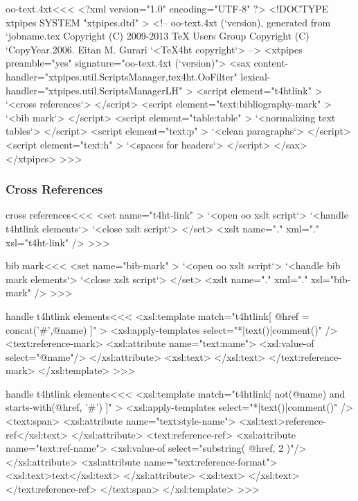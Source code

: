 \documentclass{article}
\begin{document}






\<oo-text.4xt\><<<
<?xml version="1.0" encoding="UTF-8" ?>
<!DOCTYPE xtpipes SYSTEM "xtpipes.dtd" >
<!-- oo-text.4xt (`version), generated from `jobname.tex
     Copyright (C) 2009-2013 TeX Users Group
     Copyright (C) `CopyYear.2006. Eitan M. Gurari
`<TeX4ht copyright`> -->
<xtpipes preamble="yes" signature="oo-text.4xt (`version)">
   <sax content-handler="xtpipes.util.ScriptsManager,tex4ht.OoFilter" 
        lexical-handler="xtpipes.util.ScriptsManagerLH" >
      <script element="t4htlink" >
         `<cross references`>
      </script> 
      <script element="text:bibliography-mark" >
         `<bib mark`>
      </script> 
      <script element="table:table" >
         `<normalizing text tables`>
      </script> 
      <script element="text:p" >
         `<clean paragraphs`>
      </script> 
      <script element="text:h" >
         `<spaces for headers`>
      </script> 
   </sax>
</xtpipes>
>>>


\subsubsection{Cross References}



\<cross references\><<<
<set name="t4ht-link" >
   `<open oo xslt script`>
    `<handle t4htlink elements`>
   `<close xslt script`>
</set>
<xslt name="." xml="." xsl="t4ht-link" />
>>>

\<bib mark\><<<
<set name="bib-mark" >
   `<open oo xslt script`>
    `<handle bib mark elements`>
   `<close xslt script`>
</set>
<xslt name="." xml="." xsl="bib-mark" />
>>>



\<handle t4htlink elements\><<<
<xsl:template match="t4htlink[ @href = concat('#',@name) ]" >
  <xsl:apply-templates select="*|text()|comment()" />
  <text:reference-mark>
     <xsl:attribute name="text:name">
        <xsl:value-of select="@name"/>
     </xsl:attribute>
     <xsl:text> </xsl:text>
  </text:reference-mark>
</xsl:template> 
>>>

\<handle t4htlink elements\><<<
<xsl:template match="t4htlink[ not(@name) 
                           and
                               starts-with(@href, '#') 
]" >
  <xsl:apply-templates select="*|text()|comment()" />
   <text:span>
        <xsl:attribute name="text:style-name">
           <xsl:text>reference-ref</xsl:text>
        </xsl:attribute>
     <text:reference-ref>
        <xsl:attribute name="text:ref-name">
           <xsl:value-of select="substring( @href, 2 )"/>
        </xsl:attribute>
        <xsl:attribute name="text:reference-format">
           <xsl:text>text</xsl:text>
        </xsl:attribute>
        <xsl:text> </xsl:text>   
     </text:reference-ref>
   </text:span>
</xsl:template> 
>>>
\end{document}

